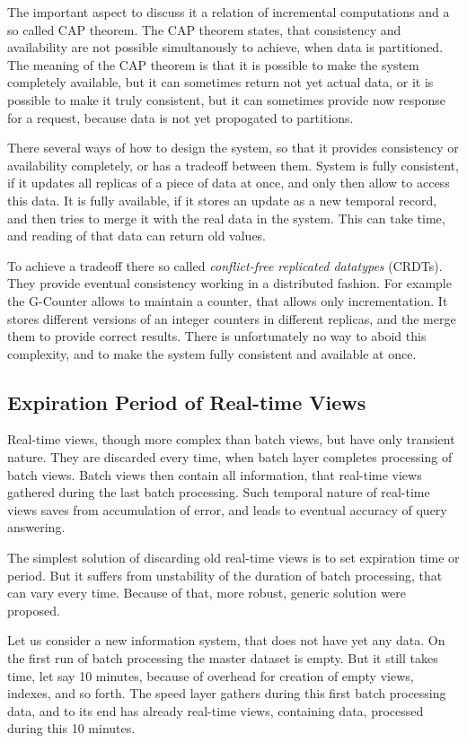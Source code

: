 The important aspect to discuss it a relation of incremental computations and a so called CAP theorem.
The CAP theorem states, that consistency and availability are not possible simultanously to achieve, when data is partitioned.
The meaning of the CAP theorem is that it is possible to make the system completely available, but it can sometimes return not yet actual data, or it is possible to make it truly consistent, but it can sometimes provide now response for a request, because data is not yet propogated to partitions.

There several ways of how to design the system, so that it provides consistency or availability completely, or has a tradeoff between them.
System is fully consistent, if it updates all replicas of a piece of data at once, and only then allow to access this data.
It is fully available, if it stores an update as a new temporal record, and then tries to merge it with the real data in the system.
This can take time, and reading of that data can return old values.

To achieve a tradeoff there so called \textit{conflict-free replicated datatypes} (CRDTs).
They provide eventual consistency working in a distributed fashion.
For example the G-Counter allows to maintain a counter, that allows only incrementation.
It stores different versions of an integer counters in different replicas, and the merge them to provide correct results.
There is unfortunately no way to aboid this complexity, and to make the system fully consistent and available at once.

\subsection{Expiration Period of Real-time Views}

Real-time views, though more complex than batch views, but have only transient nature.
They are discarded every time, when batch layer completes processing of batch views.
Batch views then contain all information, that real-time views gathered during the last batch processing. 
Such temporal nature of real-time views saves from accumulation of error, and leads to eventual accuracy of query answering.

The simplest solution of discarding old real-time views is to set expiration time or period.
But it suffers from unstability of the duration of batch processing, that can vary every time.
Because of that, more robust, generic solution were proposed.

Let us consider a new information system, that does not have yet any data.
On the first run of batch processing the master dataset is empty.
But it still takes time, let say 10 minutes, because of overhead for creation of empty views, indexes, and so forth.
The speed layer gathers during this first batch processing data, and to its end has already real-time views, containing data, processed during this 10 minutes.

